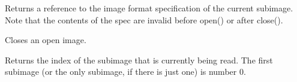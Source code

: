 Returns a reference to the image format specification of the
current subimage.  Note that the contents of the spec are
invalid before {\kw open()} or after {\kw close()}.
\apiend

Closes an open image.
\apiend


Returns the index of the subimage that is currently being read.
The first subimage (or the only subimage, if there is just one) is
number 0.
\apiend

\begin{comment}

\apiitem{bool seek_subimage (int index, ImageIOFormatSpec \&newspec)}
Seek to the given subimage.  Return true on success, false on
failure (including that there is not a subimage with that
index).  The new subimage's vital statistics are put in newspec
(and also saved in this->spec).  The reader is expected to give
the appearance of random access to subimages -- in other words,
if it can't randomly seek to the given subimage, it should
transparently close, reopen, and sequentially read through prior
subimages.
\apiend

\apiitem{bool read_scanline (int y, int z, ParamBaseType format, void *data,
                                stride_t xstride=AutoStride)}
Read the scanline that includes pixels (*,y,z) into data,
converting if necessary from the native data format of the file
into the 'format' specified (z==0 for non-volume images).  The
stride value gives the data spacing of adjacent pixels (in
bytes).  Strides set to AutoStride imply 'contiguous' data (i.e.
xstride==spec.nchannels*ParamBaseTypeSize(format)).  The reader
is expected to give the appearance of random access -- in other
words, if it can't randomly seek to the given scanline, it
should transparently close, reopen, and sequentially read
through prior scanlines.  The base ImageInput class has a
default implementation that calls read_native_scanline and then
does appropriate format conversion, so there's no reason for
each format plugin to override this method.
\apiend


\apiitem{bool read_scanline (int y, int z, float *data)}
Simple read_scanline reads to contiguous float pixels.
\apiend


\end{comment}
